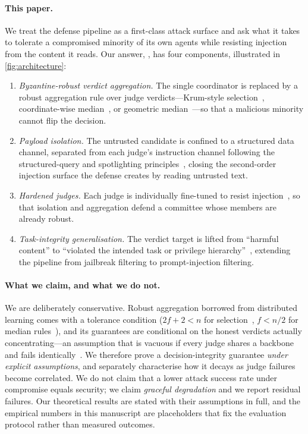 \paragraph{This paper.}
We treat the defense pipeline as a first-class attack surface and ask what it takes to
tolerate a compromised minority of its own agents while resisting injection from the
content it reads. Our answer, \Aegis, has four components, illustrated in
\cref{fig:architecture}:
\begin{enumerate}[leftmargin=1.6em,itemsep=2pt,topsep=2pt]
  \item \emph{Byzantine-robust verdict aggregation.} The single coordinator is replaced
        by a robust aggregation rule over judge verdicts—Krum-style
        selection~\cite{blanchard2017krum}, coordinate-wise
        median~\cite{yin2018byzantine}, or geometric
        median~\cite{chen2017byzantine,pillutla2022rfa}—so that a malicious minority
        cannot flip the decision.
  \item \emph{Payload isolation.} The untrusted candidate is confined to a structured
        data channel, separated from each judge's instruction channel following the
        structured-query and spotlighting
        principles~\cite{chen2024struq,hines2024spotlighting}, closing the second-order
        injection surface the defense creates by reading untrusted text.
  \item \emph{Hardened judges.} Each judge is individually fine-tuned to resist
        injection~\cite{chen2025secalign,chen2024struq}, so that isolation and
        aggregation defend a committee whose members are already robust.
  \item \emph{Task-integrity generalisation.} The verdict target is lifted from
        ``harmful content'' to ``violated the intended task or privilege
        hierarchy''~\cite{wallace2024instruction}, extending the pipeline from jailbreak
        filtering to prompt-injection filtering.
\end{enumerate}

\paragraph{What we claim, and what we do not.}
We are deliberately conservative. Robust aggregation borrowed from distributed learning
comes with a tolerance condition ($2f{+}2<n$ for
selection~\cite{blanchard2017krum}, $f<n/2$ for median
rules~\cite{yin2018byzantine}), and its guarantees are conditional on the honest
verdicts actually concentrating—an assumption that is vacuous if every judge shares a
backbone and fails identically~\cite{kuncheva2003diversity}. We therefore prove a
decision-integrity guarantee \emph{under explicit assumptions}, and separately
characterise how it decays as judge failures become correlated. We do not claim that a
lower attack success rate under compromise equals security; we claim \emph{graceful
degradation} and we report residual failures. Our theoretical results are stated with
their assumptions in full, and the empirical numbers in this manuscript are placeholders
that fix the evaluation protocol rather than measured outcomes.

